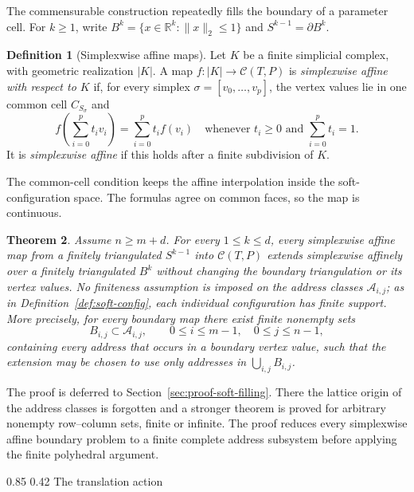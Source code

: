 \documentclass[11pt,reqno]{amsart}
\makeatletter
\numberwithin{equation}{section}
\renewcommand\subsection{\@startsection{subsection}{2}{\z@}%
  {0.85\baselineskip \@plus 0.25\baselineskip \@minus 0.10\baselineskip}%
  {0.42\baselineskip}%
  {\normalfont\bfseries}}
\newtheorem{theorem}{Theorem}[section]
\theoremstyle{definition}
\newtheorem{definition}[theorem]{Definition}
\theoremstyle{remark}
\newcommand{\R}{\mathbb R}
\newcommand{\norm}[1]{\lVert #1\rVert}
\makeatother
\begin{document}
The commensurable construction repeatedly fills the boundary of a parameter cell.  For $k\ge1$, write $B^k=\{x\in\R^k:\norm{x}_2\le1\}$ and $S^{k-1}=\partial B^k$.

\begin{definition}[Simplexwise affine maps]\label{def:simplexwise-affine}
Let $K$ be a finite simplicial complex, with geometric realization $|K|$.  A map $f:|K|\to\mathcal C(T,P)$ is \emph{simplexwise affine with respect to $K$} if, for every simplex $\sigma=[v_0,\ldots,v_p]$, the vertex values lie in one common cell $C_{S_\sigma}$ and
\[
 f\!\left(\sum_{i=0}^pt_iv_i\right)=\sum_{i=0}^pt_if(v_i)
 \quad\text{whenever }t_i\ge0\text{ and }\sum_{i=0}^pt_i=1.
\]
It is \emph{simplexwise affine} if this holds after a finite subdivision of $K$.
\end{definition}
The common-cell condition keeps the affine interpolation inside the soft-configuration space.  The formulas agree on common faces, so the map is continuous.

\begin{theorem}\label{thm:soft-filling}
Assume $n\ge m+d$.  For every $1\le k\le d$, every simplexwise affine map from a finitely
triangulated $S^{k-1}$ into $\mathcal C(T,P)$ extends simplexwise affinely
over a finitely triangulated $B^k$ without changing the boundary
triangulation or its vertex values.  No finiteness assumption is imposed on
the address classes $\mathcal A_{i,j}$; as in Definition~\ref{def:soft-config},
each individual configuration has finite support.  More precisely, for every
boundary map there exist finite nonempty sets
\[
 B_{i,j}\subset\mathcal A_{i,j},
 \qquad 0\le i\le m-1,\quad 0\le j\le n-1,
\]
containing every address that occurs in a boundary vertex value, such that
the extension may be chosen to use only addresses in
$\bigcup_{i,j}B_{i,j}$.
\end{theorem}

The proof is deferred to Section~\ref{sec:proof-soft-filling}.  There the
lattice origin of the address classes is forgotten and a stronger theorem is
proved for arbitrary nonempty row--column sets, finite or infinite.  The
proof reduces every simplexwise affine boundary problem to a finite complete
address subsystem before applying the finite polyhedral argument.

\subsection{The translation action}\label{sec:commensurable-construction}
\end{document}
